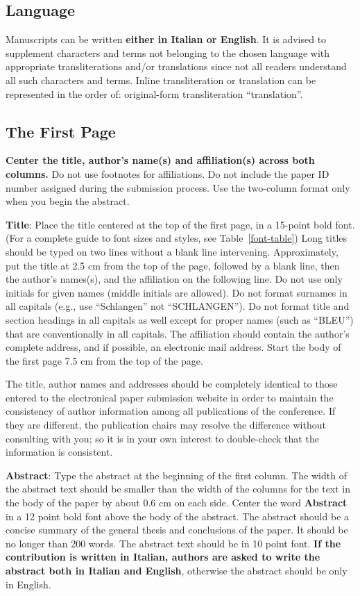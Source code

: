 \documentclass[11pt]{article}
\begin{document}
\subsection{Language}
\label{ssec:lang}
Manuscripts can be written {\bf either in Italian or English}. It is 
advised to supplement characters and terms not belonging to the
chosen language with appropriate transliterations and/or translations
since not all readers understand all such characters and terms.
Inline transliteration or translation can be represented in
the order of: original-form transliteration ``translation''.


\subsection{The First Page}
\label{ssec:first}

\textbf{Center the title, author's name(s) and affiliation(s) across both
columns.} Do not use footnotes for affiliations. Do not include the
paper ID number assigned during the submission process. Use the
two-column format only when you begin the abstract.

{\bf Title}: Place the title centered at the top of the first page, in
a 15-point bold font. (For a complete guide to font sizes and styles,
see Table~\ref{font-table}) Long titles should be typed on two lines
without a blank line intervening. Approximately, put the title at 2.5
cm from the top of the page, followed by a blank line, then the
author's names(s), and the affiliation on the following line. Do not
use only initials for given names (middle initials are allowed). Do
not format surnames in all capitals (e.g., use ``Schlangen'' not
``SCHLANGEN'').  Do not format title and section headings in all
capitals as well except for proper names (such as ``BLEU'') that are
conventionally in all capitals.  The affiliation should contain the
author's complete address, and if possible, an electronic mail
address. Start the body of the first page 7.5 cm from the top of the
page.

The title, author names and addresses should be completely identical
to those entered to the electronical paper submission website in order
to maintain the consistency of author information among all
publications of the conference. If they are different, the publication
chairs may resolve the difference without consulting with you; so it
is in your own interest to double-check that the information is
consistent.

{\bf Abstract}: \label{ssec:abs} Type the abstract at the beginning of the first
column. The width of the abstract text should be smaller than the
width of the columns for the text in the body of the paper by about
0.6 cm on each side. Center the word {\bf Abstract} in a 12 point bold
font above the body of the abstract. The abstract should be a concise
summary of the general thesis and conclusions of the paper. It should
be no longer than 200 words. The abstract text should be in 10 point font. {\bf  If the contribution is written in Italian, authors are asked to write the abstract  both in Italian and English}, otherwise the abstract should be only in English.
\end{document}
